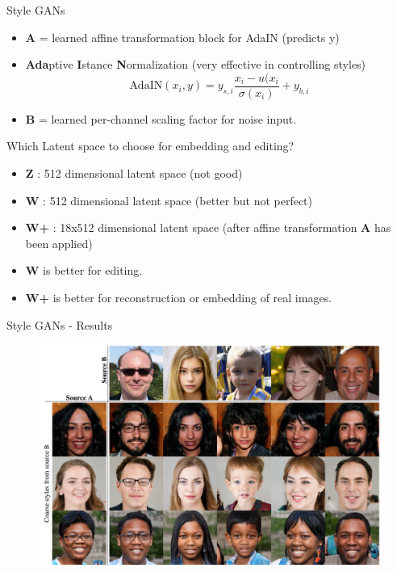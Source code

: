 \begin{frame}[allowframebreaks]{Style GANs}

\begin{itemize}
    \item \textbf{A} = learned affine transformation block for AdaIN (predicts y)
    \item \textbf{Ada}ptive \textbf{I}stance \textbf{N}ormalization (very effective in controlling styles)
    $$\text{AdaIN}(x_i,y) = y_{s,i}\frac{x_i - u(x_i}{\sigma(x_i)} + y_{b,i}$$
    \item \textbf{B} = learned per-channel scaling factor for noise input.

\end{itemize}

\end{frame}

\begin{frame}[allowframebreaks]{Which Latent space to choose for embedding and editing?}
\begin{itemize}
    \item \textbf{Z} : 512 dimensional latent space (not good)
    \item \textbf{W} : 512 dimensional latent space (better but not perfect)
    \item \textbf{W+} : 18x512 dimensional latent space (after affine transformation \textbf{A} has been applied)
    \item \textbf{W} is better for editing.
    \item \textbf{W+} is better for reconstruction or embedding of real images.
\end{itemize}

\end{frame}

\begin{frame}[allowframebreaks]{Style GANs - Results}
\begin{figure}
    \centering
    \includegraphics[height=0.9\textheight, width=\textwidth, keepaspectratio]{images/gan/stylegan_3.png}
\end{figure}
\end{frame}